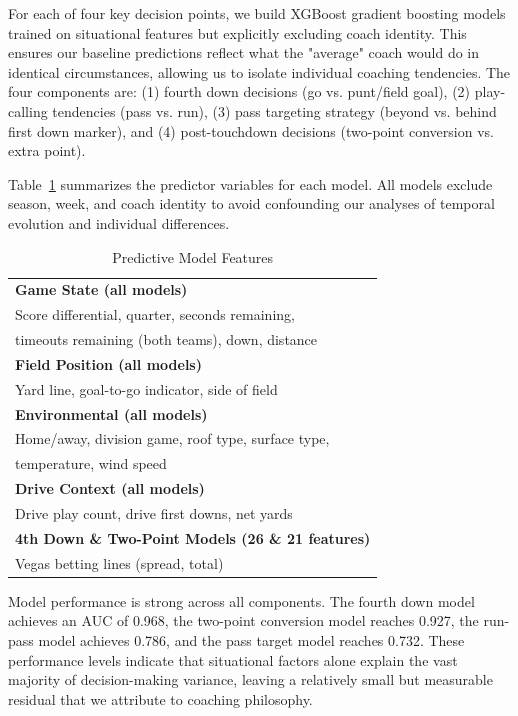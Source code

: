\documentclass[11pt,twocolumn]{article}
\begin{document}
For each of four key decision points, we build XGBoost gradient boosting models trained on situational features but explicitly excluding coach identity. This ensures our baseline predictions reflect what the "average" coach would do in identical circumstances, allowing us to isolate individual coaching tendencies. The four components are: (1) fourth down decisions (go vs. punt/field goal), (2) play-calling tendencies (pass vs. run), (3) pass targeting strategy (beyond vs. behind first down marker), and (4) post-touchdown decisions (two-point conversion vs. extra point).

Table~\ref{tab:model_features} summarizes the predictor variables for each model. All models exclude season, week, and coach identity to avoid confounding our analyses of temporal evolution and individual differences.

\begin{table}[H]
\centering
\caption{Predictive Model Features}
\label{tab:model_features}
\scriptsize
\begin{tabular}{l}
\toprule
\textbf{Game State (all models)} \\
\quad Score differential, quarter, seconds remaining, \\
\quad timeouts remaining (both teams), down, distance \\
\midrule
\textbf{Field Position (all models)} \\
\quad Yard line, goal-to-go indicator, side of field \\
\midrule
\textbf{Environmental (all models)} \\
\quad Home/away, division game, roof type, surface type, \\
\quad temperature, wind speed \\
\midrule
\textbf{Drive Context (all models)} \\
\quad Drive play count, drive first downs, net yards \\
\midrule
\textbf{4th Down \& Two-Point Models (26 \& 21 features)} \\
\quad Vegas betting lines (spread, total) \\
\bottomrule
\end{tabular}
\end{table}

Model performance is strong across all components. The fourth down model achieves an AUC of 0.968, the two-point conversion model reaches 0.927, the run-pass model achieves 0.786, and the pass target model reaches 0.732. These performance levels indicate that situational factors alone explain the vast majority of decision-making variance, leaving a relatively small but measurable residual that we attribute to coaching philosophy.
\end{document}
